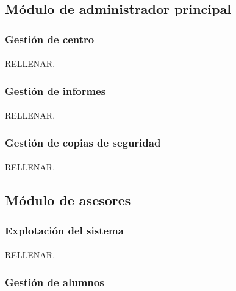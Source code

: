    \subsection{Módulo de administrador principal}

      \subsubsection{Gestión de centro}

      \paragraph{}RELLENAR.

      \subsubsection{Gestión de informes}

      \paragraph{}RELLENAR.

      \subsubsection{Gestión de copias de seguridad}

      \paragraph{}RELLENAR.

   \subsection{Módulo de asesores}

      \subsubsection{Explotación del sistema}

      \paragraph{}RELLENAR.

      \subsubsection{Gestión de alumnos}\label{gestAlumnos}

